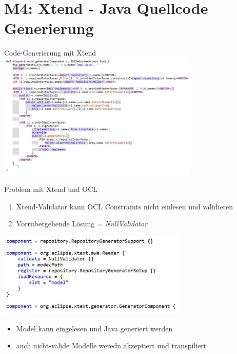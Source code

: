 \section[M4: Xtend]{M4: Xtend - Java Quellcode Generierung}
\begin{frame}{Code-Generierung mit Xtend}
	\centering
	\includegraphics[height=60mm]{figures/xtend.png}
\end{frame}

\begin{frame}{Problem mit Xtend und OCL}
	\begin{enumerate}
		\item Xtend-Validator kann OCL Constraints nicht einlesen und validieren
		\item Vorrübergehende Lösung = \textit{NullValidator}
	\end{enumerate}
	\centering
	\includegraphics[height=40mm]{figures/xtend-validator.png}
	\begin{itemize}
		\item Model kann eingelesen und Java generiert werden
		\item auch nicht-valide Modelle weredn akzeptiert und transpiliert
	\end{itemize}
\end{frame}